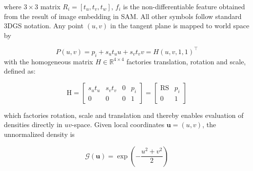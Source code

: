 \documentclass[numbers]{article}
\begin{document}
where $3\times3$ matrix \(R_i=[t_u,t_v,t_w]\), $f_i$ is the non-differentiable feature obtained from the result of image embedding in SAM. All other symbols follow standard 3DGS notation. Any point \((u,v)\) in the tangent plane is mapped to world space by  

\begin{equation}
        P(u, v) = p_i + s_u t_u u + s_v t_v v = H(u, v, 1, 1)^\top
\end{equation}
with the homogeneous matrix \( H \in \mathbb{R}^{4 \times 4} \) factories translation, rotation and scale, defined as:

\begin{equation}
    \mathrm{H} =
        \begin{bmatrix}
          s_u t_u & s_v t_v & 0        & p_i \\
          0       & 0       & 0        & 1
        \end{bmatrix} = \begin{bmatrix}
          \text{RS} & p_i \\
          0         & 1
        \end{bmatrix}
\end{equation}

which factories rotation, scale and translation and thereby enables evaluation of densities directly in \(uv\)-space. Given local coordinates \(\mathbf u=(u,v)\), the unnormalized density is  

\begin{equation}
    \mathcal{G}(\mathbf{u}) = \exp(-\frac{u^2+v^2}{2})
\end{equation}
\end{document}
